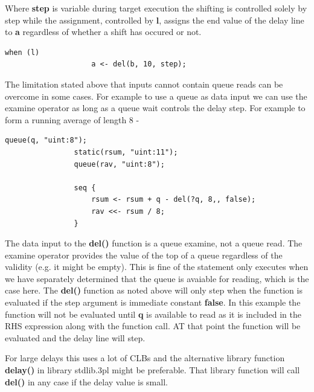             Where {\bf step} is variable during target execution the shifting
            is controlled solely by step while the assignment, controlled by
            {\bf l}, assigns the end value of the delay line to {\bf a}
            regardless of whether a shift has occured or not.
            \begin{lstlisting}[gobble=12, language=threepl]
                when (l)
                    a <- del(b, 10, step);
            \end{lstlisting}

            The limitation stated above that inputs cannot contain queue reads
            can be overcome in some cases. For example to use a queue as data input
            we can use the examine operator as long as a queue wait controls the
            delay step. For example to form a running average of length 8 -

            \begin{lstlisting}[gobble=12, language=threepl]
                queue(q, "uint:8");
                static(rsum, "uint:11");
                queue(rav, "uint:8");

                seq {
                    rsum <- rsum + q - del(?q, 8,, false);
                    rav <<- rsum / 8;
                }
            \end{lstlisting}
            The data input to the {\bf del()} function is a queue examine, not
            a queue read. The examine operator provides the value of the
            top of a queue regardless of the validity (e.g. it might be empty).
            This is fine of the statement only executes when we have separately
            determined that the queue is avaiable for reading, which is the case here.
            The {\bf del()} function as noted above will only step when the
            function is evaluated if the step argument is immediate constant
            {\bf false}. In this example the function will not be evaluated
            until {\bf q} is available to read as it is included in the RHS expression
            along with the function call. AT that point the function will be evaluated
            and the delay line will step.

            For large delays this uses a lot of CLBs and the alternative library
            function {\bf delay()}  in library stdlib.3pl
            might be preferable. That library function will call {\bf
            del()} in any case if the delay value is small.

